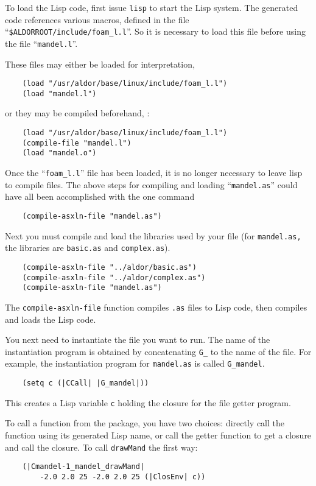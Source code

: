 To load the Lisp code, first issue {\tt lisp} to start the
Lisp system.  
The generated code references various macros, defined in the file
``{\tt \$ALDORROOT/include/foam\_l.l}''.
So it is necessary to load this file before using the file ``{\tt mandel.l}''.

These files may either be loaded for interpretation,
\begin{verbatim}
    (load "/usr/aldor/base/linux/include/foam_l.l")
    (load "mandel.l")
\end{verbatim}
or they may be compiled beforehand, \eg{}:
\begin{verbatim}
    (load "/usr/aldor/base/linux/include/foam_l.l")
    (compile-file "mandel.l")
    (load "mandel.o")
\end{verbatim}

Once the ``{\tt foam\_l.l}'' file has been loaded, it is no longer necessary to
leave lisp to compile \asharp{} files. 
The above steps for compiling and loading ``{\tt mandel.as}'' could have all
been accomplished with the one command
\begin{verbatim}
    (compile-asxln-file "mandel.as")
\end{verbatim}

Next you must compile and load the libraries used by your file
(for {\tt mandel.as,} the libraries are {\tt basic.as} and
{\tt complex.as}).
\begin{verbatim}
    (compile-asxln-file "../aldor/basic.as")
    (compile-asxln-file "../aldor/complex.as")
    (compile-asxln-file "mandel.as")
\end{verbatim}

The {\tt compile-asxln-file} function compiles {\tt .as} files to
Lisp code, then compiles and loads the Lisp code.

You next need to instantiate the file you want to run.
The name of the instantiation program is obtained by concatenating
\verb+G_+ to the name of the file.
For example, the instantiation program for {\tt mandel.as}
is called \verb+G_mandel+.
\begin{verbatim}
    (setq c (|CCall| |G_mandel|))
\end{verbatim}
This creates a Lisp variable {\tt c} holding the closure for the file
getter program.

To call a function from the package, you have two choices: directly call
the function using its generated Lisp name, or call the getter
function to get a closure and call the closure.
To call {\tt drawMand} the first way:
\begin{verbatim}
    (|Cmandel-1_mandel_drawMand|
        -2.0 2.0 25 -2.0 2.0 25 (|ClosEnv| c))
\end{verbatim}

